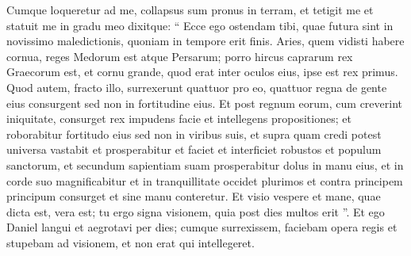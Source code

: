 \begin{biblechapter}
\begin{biblechapter}
\begin{biblechapter}
\begin{biblechapter}
\begin{biblechapter}
\begin{biblechapter}
\begin{biblechapter}
\begin{biblechapter}
\verse Cumque loqueretur ad me, collapsus sum pronus in terram, et tetigit me et statuit me in gradu meo 
\verse dixitque: “ Ecce ego ostendam tibi, quae futura sint in novissimo maledictionis, quoniam in tempore erit finis.
 \verse Aries, quem vidisti habere cornua, reges Medorum est atque Persarum; 
\verse porro hircus caprarum rex Graecorum est, et cornu grande, quod erat inter oculos eius, ipse est rex primus. 
\verse Quod autem, fracto illo, surrexerunt quattuor pro eo, quattuor regna de gente eius consurgent sed non in fortitudine eius. 
 \verse Et post regnum eorum, cum creverint iniquitate, consurget rex impudens facie et intellegens propositiones; 
\verse et roborabitur fortitudo eius sed non in viribus suis, et supra quam credi potest universa vastabit et prosperabitur et faciet et interficiet robustos et populum sanctorum, 
\verse et secundum sapientiam suam prosperabitur dolus in manu eius, et in corde suo magnificabitur et in tranquillitate occidet plurimos et contra principem principum consurget et sine manu conteretur. 
\verse Et visio vespere et mane, quae dicta est, vera est; tu ergo signa visionem, quia post dies multos erit ”. 
\verse Et ego Daniel langui et aegrotavi per dies; cumque surrexissem, faciebam opera regis et stupebam ad visionem, et non erat qui intellegeret.
 

\end{biblechapter}
\end{biblechapter}
\end{biblechapter}
\end{biblechapter}
\end{biblechapter}
\end{biblechapter}
\end{biblechapter}
\end{biblechapter}
